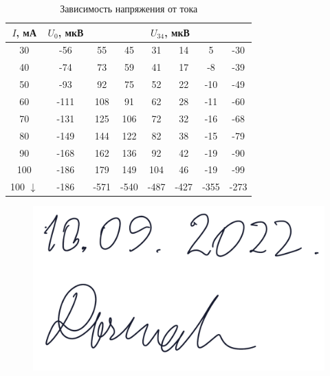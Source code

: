 \documentclass[12pt,a4paper]{article}
\begin{document}
\begin{table}[htp]
    \centering
    \begin{tabular}[]{|c|c|c|c|c|c|c|c|}
        \hline
        $I$, мА & $U_{0}$, мкВ & \multicolumn{6}{|c|}{$U_{34}$, мкВ} \\
        \hline
        30 & -56 & 55 & 45 & 31& 14& 5& -30 \\
        \hline
        40 & -74 & 73 & 59& 41 & 17 & -8& -39 \\
        \hline
        50 & -93 & 92 & 75 & 52 & 22 & -10 & -49 \\
        \hline
        60 & -111 & 108 & 91 & 62 & 28 & -11 & -60\\
        \hline
        70 & -131 & 125 & 106 & 72 & 32 & -16 & -68  \\
        \hline 
        80 & -149 & 144 & 122 & 82& 38 & -15& -79 \\
        \hline
        90 & -168 & 162 & 136 & 92 &42 & -19& -90 \\
        \hline
        100 & -186& 179 & 149 & 104& 46& -19 & -99 \\
        \hline
        100 $\downarrow$ & -186& -571 & -540 & -487 & -427 & -355 & -273  \\
        \hline
    \end{tabular}
    \caption{Зависимость напряжения от тока}
\end{table}
\begin{figure}[h!]
    \begin{flushright}
        \includegraphics[scale=0.17]{signa.png}
    \end{flushright}
\end{figure}
\end{document}
